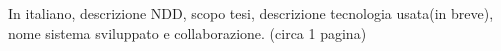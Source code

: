 In italiano, descrizione NDD, scopo tesi, descrizione tecnologia usata(in breve), nome sistema sviluppato e collaborazione. (circa 1 pagina)
\cite{Ciao}